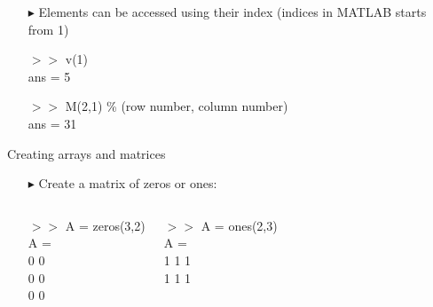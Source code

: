 \documentclass[xcolor={dvipsnames,rgb}, aspectratio=169]{beamer}
\begin{document}
\begin{frame}{}
    \begin{itemize}
        \item[$\blacktriangleright$] Elements can be accessed using their index (indices in
              MATLAB starts from 1)
              \begin{tcolorbox}[colback=white,colframe=bluepoli]
                  $>>$ v(1) \\
                  ans = 5
              \end{tcolorbox}

              \begin{tcolorbox}[colback=white,colframe=bluepoli]
                  $>>$ M(2,1) \color{codegreen} \% (row number, column number) \\
                  \color{black}
                  ans = 31
              \end{tcolorbox}
    \end{itemize}
\end{frame}

\begin{frame}{Creating arrays and matrices}
    \begin{itemize}
        \item[$\blacktriangleright$] Create a matrix of zeros or ones:
              \begin{columns}[T]
                  \begin{tcolorbox}[colback=white,colframe=bluepoli]
                      $>>$ A = zeros(3,2) \\
                      A = \\
                      \hspace{3em} 0 \hspace{3em} 0 \\
                      \hspace{3em} 0 \hspace{3em} 0 \\
                      \hspace{3em} 0 \hspace{3em} 0
                  \end{tcolorbox}
                  \begin{tcolorbox}[colback=white,colframe=bluepoli]
                      $>>$ A = ones(2,3) \\
                      A = \\
                      \hspace{3em} 1 \hspace{3em} 1 \hspace{3em} 1 \\
                      \hspace{3em} 1 \hspace{3em} 1 \hspace{3em} 1 \\
                  \end{tcolorbox}
              \end{columns}
    \end{itemize}
\end{frame}
\end{document}
